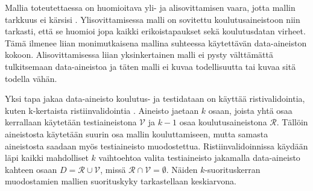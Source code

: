 Mallia toteutettaessa on huomioitava yli- ja alisovittamisen vaara, jotta mallin tarkkuus ei kärsisi \citep{hamalainenClassifiersEducationalData2010}. Ylisovittamisessa malli on sovitettu koulutusaineistoon niin tarkasti, että se huomioi jopa kaikki erikoistapaukset sekä koulutusdatan virheet. Tämä ilmenee liian monimutkaisena mallina suhteessa käytettävän data-aineiston kokoon. Alisovittamisessa liian yksinkertainen malli ei pysty välttämättä tulkitsemaan data-aineistoa ja täten malli ei kuvaa todellisuutta tai kuvaa sitä todella vähän.

Yksi tapa jakaa data-aineisto koulutus- ja testidataan on käyttää ristivalidointia, kuten k-kertaista ristiinvalidointia \citep{deisenrothMathematicsMachineLearning2020}. Aineisto jaetaan $k$ osaan, joista yhtä osaa kerrallaan käytetään testiaineistona $\mathcal{V}$ ja $k-1$ osaa koulutusaineistona $\mathcal{R}$. Tällöin aineistosta käytetään suurin osa mallin kouluttamiseen, mutta samasta aineistosta saadaan myös testiaineisto muodostettua. Ristiinvalidoinnissa käydään läpi kaikki mahdolliset $k$ vaihtoehtoa valita testiaineisto jakamalla data-aineisto kahteen osaan $D = \mathcal{R} \cup \mathcal{V}$, missä $\mathcal{R} \cap \mathcal{V} = \emptyset$. Näiden $k$-suorituskerran muodostamien mallien suorituskyky tarkastellaan keskiarvona.

